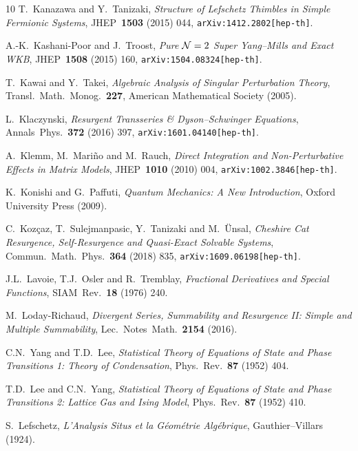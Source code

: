 \documentclass[11pt,a4paper]{article}
\newcommand{\CN}{{\cal N}}
\begin{document}
\begin{thebibliography}{10}
T.~Kanazawa and Y.~Tanizaki,
\textit{Structure of Lefschetz Thimbles in Simple Fermionic Systems},
JHEP\ \textbf{1503} (2015) 044,
\texttt{arXiv:1412.2802[hep-th]}.

A.-K.~Kashani-Poor and J.~Troost,
\textit{Pure $\CN=\text{2}$ Super Yang--Mills and Exact WKB},
JHEP\ \textbf{1508} (2015) 160,
\texttt{arXiv:1504.08324[hep-th]}.

T.~Kawai and Y.~Takei,
\textit{Algebraic Analysis of Singular Perturbation Theory},
Transl.\ Math.\ Monog.\ \textbf{227},
American Mathematical Society (2005).

L.~Klaczynski,
\textit{Resurgent Transseries \& Dyson--Schwinger Equations},
Annals\ Phys.\ \textbf{372} (2016) 397,
\texttt{arXiv:1601.04140[hep-th]}.

A.~Klemm, M.~Mari\~no and M.~Rauch,
\textit{Direct Integration and Non-Perturbative Effects in Matrix Models},
JHEP\ \textbf{1010} (2010) 004,
\texttt{arXiv:1002.3846[hep-th]}.

K.~Konishi and G.~Paffuti,
\textit{Quantum Mechanics: A New Introduction},
Oxford University Press (2009).

C.~Koz\c caz, T.~Sulejmanpasic, Y.~Tanizaki and M.~\"Unsal,
\textit{Cheshire Cat Resurgence, Self-Resurgence and Quasi-Exact Solvable Systems},
Commun.\ Math.\ Phys.\ \textbf{364} (2018) 835,
\texttt{arXiv:1609.06198[hep-th]}.

J.L.~Lavoie, T.J.~Osler and R.~Tremblay,
\textit{Fractional Derivatives and Special Functions},
SIAM\ Rev.\ \textbf{18} (1976) 240.

M.~Loday-Richaud,
\textit{Divergent Series, Summability and Resurgence II: Simple and Multiple Summability},
Lec.\ Notes\ Math.\ \textbf{2154} (2016).

C.N.~Yang and T.D.~Lee,
\textit{Statistical Theory of Equations of State and Phase Transitions 1: Theory of Condensation},
Phys.\ Rev.\ \textbf{87} (1952) 404.

T.D.~Lee and C.N.~Yang,
\textit{Statistical Theory of Equations of State and Phase Transitions 2: Lattice Gas and Ising Model},
Phys.\ Rev.\ \textbf{87} (1952) 410.

S.~Lefschetz,
\textit{L'Analysis Situs et la G\'eom\'etrie Alg\'ebrique},
Gauthier--Villars (1924).


\end{thebibliography}
\end{document}
